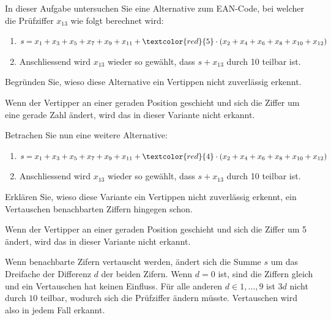 \begin{myexercise}
	In dieser Aufgabe untersuchen Sie eine Alternative zum \gls{EAN}-Code, bei welcher die Prüfziffer \( x_{13} \) wie folgt berechnet wird:

	\begin{enumerate}
		\item \(s=x_1+x_3+ x_5+ x_7+ x_9+ x_{11}+\textcolor{red}{5}\cdot( x_2+ x_4+ x_6+ x_8+ x_{10}+ x_{12})\)
		\item Anschliessend wird \(x_{13}\) wieder so gewählt, dass \(s+x_{13}\) durch 10 teilbar ist.
	\end{enumerate}

	Begründen Sie, wieso diese Alternative ein Vertippen nicht zuverlässig erkennt.

	\begin{myanswer}
		Wenn der Vertipper an einer geraden Position geschieht und sich die Ziffer um eine gerade Zahl ändert, wird das in dieser Variante nicht erkannt.
	\end{myanswer}

	\begin{mychallenge}
		Betrachen Sie nun eine weitere Alternative:

		\begin{enumerate}
			\item \(s=x_1+x_3+ x_5+ x_7+ x_9+ x_{11}+\textcolor{red}{4}\cdot( x_2+ x_4+ x_6+ x_8+ x_{10}+ x_{12})\)
			\item Anschliessend wird \(x_{13}\) wieder so gewählt, dass \(s+x_{13}\) durch 10 teilbar ist.
		\end{enumerate}

		Erklären Sie, wieso diese Variante ein Vertippen nicht zuverlässig erkennt, ein Vertauschen benachbarten Ziffern hingegen schon.
		\begin{myanswer}
			Wenn der Vertipper an einer geraden Position geschieht und sich die Ziffer um 5 ändert, wird das in dieser Variante nicht erkannt.

			Wenn benachbarte Zifern vertauscht werden, ändert sich die Summe \(s\) um das
			Dreifache der Differenz \(d\) der beiden Zifern. Wenn \(d=0\) ist, sind die Ziffern gleich und ein Vertauschen hat keinen Einfluss. Für alle anderen \(d\in{1, \dots, 9}\) ist \(3d\) nicht durch \(10\) teilbar, wodurch sich die Prüfziffer ändern müsste. Vertauschen wird also in jedem Fall erkannt.
		\end{myanswer}
	\end{mychallenge}
\end{myexercise}





